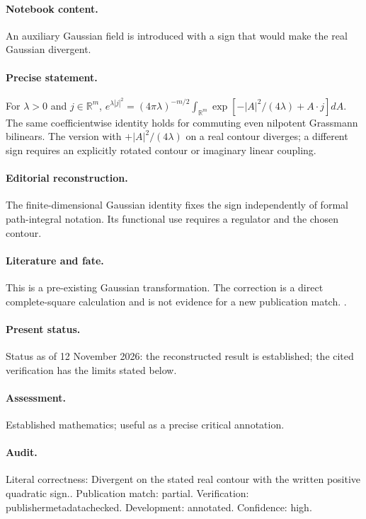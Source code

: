 \paragraph{Notebook content.} An auxiliary Gaussian field is introduced with a sign that would make the real Gaussian divergent.

\paragraph{Precise statement.} For $\lambda>0$ and $j\in\mathbb R^m$, $e^{\lambda|j|^2}=(4\pi\lambda)^{-m/2}\int_{\mathbb R^m}\exp[-|A|^2/(4\lambda)+A\cdot j]dA$. The same coefficientwise identity holds for commuting even nilpotent Grassmann bilinears. The version with $+|A|^2/(4\lambda)$ on a real contour diverges; a different sign requires an explicitly rotated contour or imaginary linear coupling.

\paragraph{Editorial reconstruction.} The finite-dimensional Gaussian identity fixes the sign independently of formal path-integral notation. Its functional use requires a regulator and the chosen contour.

\paragraph{Literature and fate.} This is a pre-existing Gaussian transformation. The correction is a direct complete-square calculation and is not evidence for a new publication match. \citep{polyakovwiegmann1983goldstone}.

\paragraph{Present status.} Status as of 12 November 2026: the reconstructed result is established; the cited verification has the limits stated below.

\paragraph{Assessment.} Established mathematics; useful as a precise critical annotation.

\paragraph{Audit.} Literal correctness: Divergent on the stated real contour with the written positive quadratic sign.. Publication match: partial. Verification: publishermetadatachecked. Development: annotated. Confidence: high.

